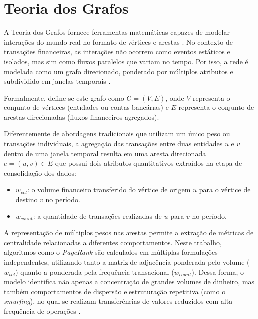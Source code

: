 \documentclass[a4paper,12pt,oneside,onecolumn,final,fleqn]{repUERJ}
\begin{document}
\section{Teoria dos Grafos}

A Teoria dos Grafos fornece ferramentas matemáticas capazes de modelar interações do mundo real no formato de vértices e arestas \cite{barabasi2016network}. No contexto de transações financeiras, as interações não ocorrem como eventos estáticos e isolados, mas sim como fluxos paralelos que variam no tempo. Por isso, a rede é modelada como um grafo direcionado, ponderado por múltiplos atributos e subdividido em janelas temporais \cite{oliveira2025complex}.

Formalmente, define-se este grafo como $G = (V, E)$, onde $V$ representa o conjunto de vértices (entidades ou contas bancárias) e $E$ representa o conjunto de arestas direcionadas (fluxos financeiros agregados). 

Diferentemente de abordagens tradicionais que utilizam um único peso ou transações individuais, a agregação das transações entre duas entidades $u$ e $v$ dentro de uma janela temporal resulta em uma aresta direcionada $e = (u, v) \in E$ que possui dois atributos quantitativos extraídos na etapa de consolidação dos dados:
\begin{itemize}
    \item $w_{vol}$: o volume financeiro transferido do vértice de origem $u$ para o vértice de destino $v$ no período.
    \item $w_{count}$: a quantidade de transações realizadas de $u$ para $v$ no período.
\end{itemize}

A representação de múltiplos pesos nas arestas permite a extração de métricas de centralidade relacionadas a diferentes comportamentos. Neste trabalho, algoritmos como o \textit{PageRank} são calculados em múltiplas formulações independentes, utilizando tanto a matriz de adjacência ponderada pelo volume ($w_{vol}$) quanto a ponderada pela frequência transacional ($w_{count}$). Dessa forma, o modelo identifica não apenas a concentração de grandes volumes de dinheiro, mas também comportamentos de dispersão e estruturação repetitiva (como o \textit{smurfing}), no qual se realizam transferências de valores reduzidos com alta frequência de operações \cite{vilella2025weirdnodes}.
\end{document}
